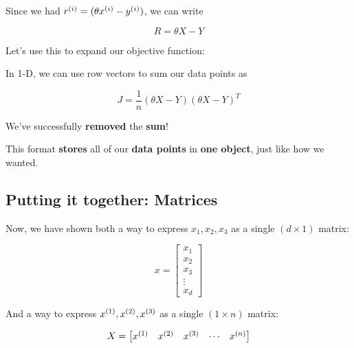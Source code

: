         Since we had $r^{(i)} = (\theta x^{(i)} - y^{(i)} )$, we can write 
        
        \begin{equation}
            R = \theta X - Y
        \end{equation}
        
        Let's use this to expand our objective function:\\
        
        \begin{concept}
            In 1-D, we can use row vectors to sum our data points as
            
            \begin{equation*}
                J = \frac{1}{n} (\theta X - Y)(\theta X - Y)^T
            \end{equation*}
        \end{concept}
        
        We've successfully \textbf{removed} the \textbf{sum}!
        
        This format \textbf{stores} all of our \textbf{data points} in \textbf{one object}, just like how we wanted.
        
    \subsection{Putting it together: Matrices}
    
        Now, we have shown both a way to express $x_1, x_2, x_3$ as a single $(d \times 1)$ matrix:
        
        \begin{equation}
            x = 
            \begin{bmatrix}
              x_1 \\ x_2 \\ x_3 \\ \vdots \\ x_d
            \end{bmatrix}
        \end{equation}
        
        And a way to express $x^{(1)}, x^{(2)}, x^{(3)}$ as a single $(1 \times n)$ matrix:
        
        \begin{equation}
            X =
                \begin{bmatrix}
                  x^{(1)} & x^{(2)} & x^{(3)} & \cdots & x^{(n)}
                \end{bmatrix}
        \end{equation}
        
